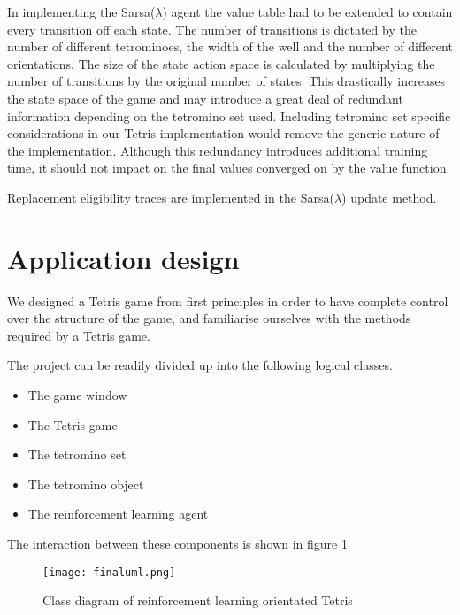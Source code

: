\documentclass{rucsthesis}
\begin{document}
In implementing the Sarsa($\lambda$) agent the value table had to be extended to contain every transition off each state. The number of transitions is dictated by the number of different tetrominoes, the width of the well and the number of different orientations.  The size of the state action space is calculated by multiplying the number of transitions by the original number of states. This drastically increases the state space of the game and may introduce a great deal of redundant information depending on the tetromino set used. Including tetromino set specific considerations in our Tetris implementation would remove the generic nature of the implementation. Although this redundancy introduces additional training time, it should not impact on the final values converged on by the value function.

Replacement eligibility traces are implemented in the Sarsa($\lambda$) update method. 

\section{Application design}

We designed a Tetris game from first principles in order to have complete control over the structure of the game, and familiarise ourselves with the methods required by a Tetris game.

The project can be readily divided up into the following logical classes.

\begin{itemize}
\item{The game window}
\item{The Tetris game}
\item{The tetromino set}
\item{The tetromino object}
\item{The reinforcement learning agent}
\end{itemize}

The interaction between these components is shown in figure \ref{fig:uml}

\begin{figure}[h]
\centering
\texttt{[image: finaluml.png]}
\caption{Class diagram of reinforcement learning orientated Tetris}
\label{fig:uml}
\end{figure}
\end{document}
